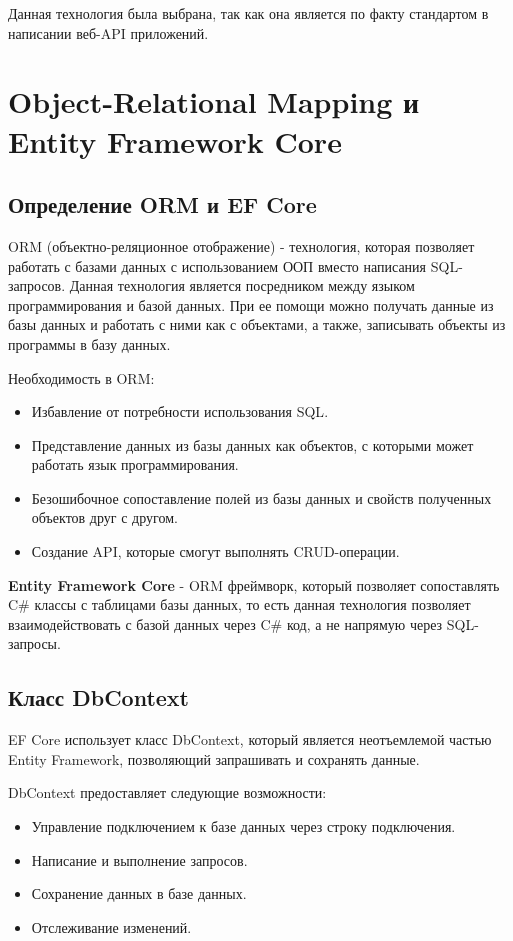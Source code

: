 \documentclass[a4paper,12pt]{report}
\begin{document}
Данная технология была выбрана, так как она является по факту стандартом в написании веб-\acs{API} приложений.

\section{Object-Relational Mapping и Entity Framework Core}

\subsection{Определение \acs{ORM} и \acs{EF} Core}

\acs{ORM} (объектно-реляционное отображение) - технология, которая позволяет работать с базами данных 
с использованием \acs{ООП} вместо написания \acs{SQL}-запросов. Данная технология является посредником между языком программирования и базой данных. 
При ее помощи можно получать данные из базы данных и работать с ними как с объектами, а также, записывать объекты из программы в базу данных.

Необходимость в \acs{ORM}:
\begin{itemize}
    \item
        Избавление от потребности использования \acs{SQL}.
    \item
        Представление данных из базы данных как объектов, с которыми может работать язык программирования.
    \item
        Безошибочное сопоставление полей из базы данных и свойств полученных объектов друг с другом.
    \item
        Создание \acs{API}, которые смогут выполнять \acs{CRUD}-операции.
\end{itemize}

\textbf{Entity Framework Core} - \acs{ORM} фреймворк, который позволяет сопоставлять C\# классы с таблицами базы данных, 
то есть данная технология позволяет взаимодействовать с базой данных через C\# код, а не напрямую через \acs{SQL}-запросы.


\subsection{Класс DbContext}

\acs{EF} Core использует класс DbContext, который является неотъемлемой частью Entity Framework, позволяющий запрашивать и сохранять данные. 

DbContext предоставляет следующие возможности:
\begin{itemize}
    \item
        Управление подключением к базе данных через строку подключения.
    \item 
        Написание и выполнение запросов.
    \item
        Сохранение данных в базе данных.
    \item
        Отслеживание изменений.
\end{itemize}
\end{document}
